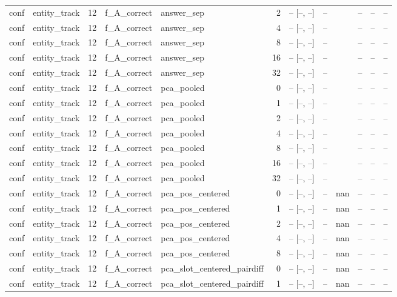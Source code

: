 \begin{tabular}{llrllrrrlrrr}
conf & entity\_track & 12 & f\_A\_correct & answer\_sep & 2 & -- [--, --] & -- &  & -- & -- & -- \\
conf & entity\_track & 12 & f\_A\_correct & answer\_sep & 4 & -- [--, --] & -- &  & -- & -- & -- \\
conf & entity\_track & 12 & f\_A\_correct & answer\_sep & 8 & -- [--, --] & -- &  & -- & -- & -- \\
conf & entity\_track & 12 & f\_A\_correct & answer\_sep & 16 & -- [--, --] & -- &  & -- & -- & -- \\
conf & entity\_track & 12 & f\_A\_correct & answer\_sep & 32 & -- [--, --] & -- &  & -- & -- & -- \\
conf & entity\_track & 12 & f\_A\_correct & pca\_pooled & 0 & -- [--, --] & -- &  & -- & -- & -- \\
conf & entity\_track & 12 & f\_A\_correct & pca\_pooled & 1 & -- [--, --] & -- &  & -- & -- & -- \\
conf & entity\_track & 12 & f\_A\_correct & pca\_pooled & 2 & -- [--, --] & -- &  & -- & -- & -- \\
conf & entity\_track & 12 & f\_A\_correct & pca\_pooled & 4 & -- [--, --] & -- &  & -- & -- & -- \\
conf & entity\_track & 12 & f\_A\_correct & pca\_pooled & 8 & -- [--, --] & -- &  & -- & -- & -- \\
conf & entity\_track & 12 & f\_A\_correct & pca\_pooled & 16 & -- [--, --] & -- &  & -- & -- & -- \\
conf & entity\_track & 12 & f\_A\_correct & pca\_pooled & 32 & -- [--, --] & -- &  & -- & -- & -- \\
conf & entity\_track & 12 & f\_A\_correct & pca\_pos\_centered & 0 & -- [--, --] & -- & nan & -- & -- & -- \\
conf & entity\_track & 12 & f\_A\_correct & pca\_pos\_centered & 1 & -- [--, --] & -- & nan & -- & -- & -- \\
conf & entity\_track & 12 & f\_A\_correct & pca\_pos\_centered & 2 & -- [--, --] & -- & nan & -- & -- & -- \\
conf & entity\_track & 12 & f\_A\_correct & pca\_pos\_centered & 4 & -- [--, --] & -- & nan & -- & -- & -- \\
conf & entity\_track & 12 & f\_A\_correct & pca\_pos\_centered & 8 & -- [--, --] & -- & nan & -- & -- & -- \\
conf & entity\_track & 12 & f\_A\_correct & pca\_slot\_centered\_pairdiff & 0 & -- [--, --] & -- & nan & -- & -- & -- \\
conf & entity\_track & 12 & f\_A\_correct & pca\_slot\_centered\_pairdiff & 1 & -- [--, --] & -- & nan & -- & -- & -- \\

\end{tabular}
